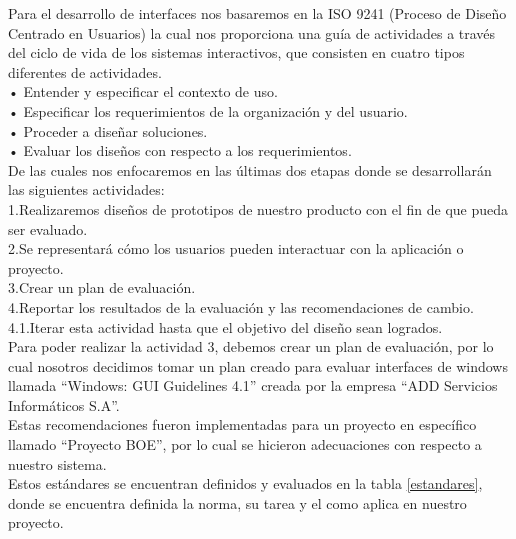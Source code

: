 \noindent Para el desarrollo de interfaces nos basaremos en la ISO 9241 (Proceso de Diseño Centrado en Usuarios) la cual nos proporciona una guía de actividades a través del ciclo de vida de los sistemas interactivos, que consisten en cuatro tipos diferentes de actividades.\\

\noindent• Entender y especificar el contexto de uso.\\
• Especificar los requerimientos de la organización y del usuario.\\
• Proceder a diseñar soluciones.\\
• Evaluar los diseños con respecto a los requerimientos.\\
De las cuales nos enfocaremos en las últimas dos etapas donde se desarrollarán las siguientes actividades:\\

\noindent 1.Realizaremos diseños de prototipos de nuestro producto con el fin de que pueda ser evaluado.\\
2.Se representará cómo los usuarios pueden interactuar con la aplicación o proyecto.\\
3.Crear un plan de evaluación.\\
4.Reportar los resultados de la evaluación y las recomendaciones de cambio.\\
4.1.Iterar esta actividad hasta que el objetivo del diseño sean logrados.\\
Para poder realizar la actividad 3, debemos crear un plan de evaluación, por lo cual nosotros decidimos tomar un plan creado para evaluar interfaces de windows llamada “Windows: GUI Guidelines 4.1” creada por la empresa “ADD Servicios Informáticos S.A”.\\

\noindent Estas recomendaciones fueron implementadas para un proyecto en específico llamado “Proyecto BOE”, por lo cual se hicieron adecuaciones con respecto a nuestro sistema.\\

 \noindent Estos estándares se encuentran definidos y evaluados en la tabla \ref{estandares}, donde se encuentra definida la norma, su tarea y el como aplica en nuestro proyecto.\\

